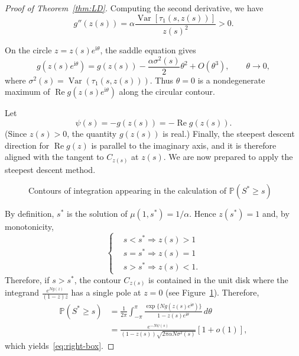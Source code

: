 \documentclass[10pt,a4paper]{amsart}
\def\PP{{\mathbb P}}
\def\PR{\mathbb{P}}
\begin{document}
\begin{proof}[{Proof of Theorem~\ref{thm:LD}}]
Computing the second derivative, we have \begin{equation}
\label{eq:var_tauz}
    g''(z(s))=\alpha \frac{\operatorname{Var}[\tau_1(s,z(s))]}{z(s)^2}>0 .
\end{equation} 
 
On the circle $z=z(s)e^{\mathrm{i}\theta}$, the saddle equation gives
\begin{equation}
    g(z(s)e^{\mathrm{i}\theta})
    =
    g(z(s))
    -
    \frac{\alpha\sigma^2(s)}{2}\theta^2
    +
    O(\theta^3),
    \qquad \theta\to0 ,
\end{equation}
where $\sigma^2(s)=\operatorname{Var}(\tau_1(s,z(s)))$.
Thus $\theta=0$ is a nondegenerate maximum of
$\operatorname{Re}g(z(s)e^{\mathrm{i}\theta})$ along the circular contour.



Let
\begin{equation}
    \label{eq:rate_psi_g}
\psi(s)=-g(z(s))=-\operatorname{Re}g(z(s)).
\end{equation}
(Since $z(s)>0$, the quantity $g(z(s))$ is real.) 
Finally, the steepest descent direction for $\operatorname{Re}g(z)$ is parallel to the imaginary axis, and it is therefore aligned with the tangent to  $C_{z(s)}$ at $z(s)$. We are now prepared to apply the steepest descent method. 
\begin{figure}

\caption{Contours of integration appearing in the calculation of $\PR(S^*\geq s)$}
\label{fig:pic}
\end{figure}
By definition, $s^*$ is the solution of $\mu(1,s^*)=1/\alpha$. Hence $z(s^*)=1$ and, by monotonicity, %
    \begin{equation}\label{eq:wts}
    \begin{cases}
        &s<s^* \Rightarrow z(s)>1\\
        &s=s^* \Rightarrow z(s)=1\\
        &s>s^*\Rightarrow z(s)<1 .
    \end{cases}
\end{equation}
Therefore, if $s>s^*$, the contour $C_{z(s)}$ is contained in the unit disk where the integrand $\frac{e^{Ng(z)}}{(1-z)z}$ has a single pole at $z=0$ (see Figure~\ref{fig:pic}). Therefore,
\begin{equation}
\begin{aligned}
\PP(S^*\geq s)
&=
\frac{1}{2\pi}
\int_{-\pi}^{\pi}
\frac{
\exp\{N g(z(s)e^{\mathrm{i}\theta})\}
}
{1-z(s)e^{\mathrm{i}\theta}}
\,d\theta\\
&=
\frac{e^{-N\psi(s)}}{
(1-z(s))\sqrt{2\pi\alpha N\sigma^2(s)}
}
\left[1+o(1)\right],
\end{aligned}
\end{equation}
which yields~\eqref{eq:right-box}.


\end{proof}
\end{document}
